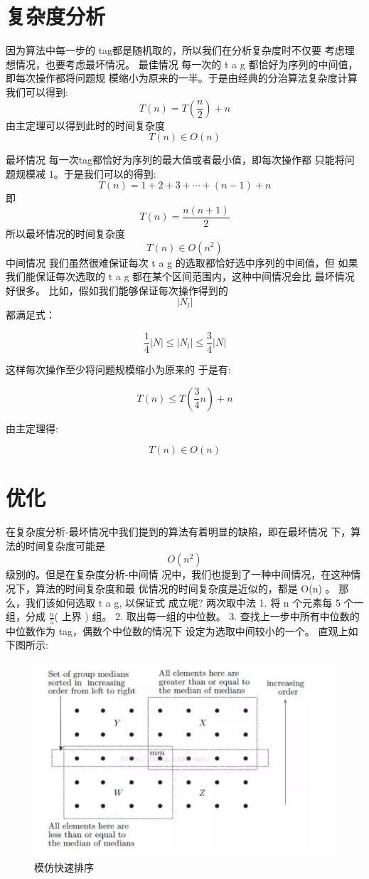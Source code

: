 \section{复杂度分析}
因为算法中每一步的 tag都是随机取的，所以我们在分析复杂度时不仅要 考虑理想情况，也要考虑最坏情况。
最佳情况  \quad  每一次的  t a g  都恰好为序列的中间值，即每次操作都将问题规 模缩小为原来的一半。于是由经典的分治算法复杂度计算我们可以得到:
$$T(n)=T\left(\frac{n}{2}\right)+n$$
由主定理可以得到此时的时间复杂度
$$T(n) \in O(n)$$

最坏情况 每一次tag都恰好为序列的最大值或者最小值，即每次操作都 只能将问题规模减 1。于是我们可以的得到:
$$
T(n)=1+2+3+\cdots+(n-1)+n
$$
即
$$
T(n)=\frac{n(n+1)}{2}
$$
所以最坏情况的时间复杂度
$$
T(n) \in O\left(n^{2}\right)
$$
中间情况  \quad  我们虽然很难保证每次  t a g  的选取都恰好选中序列的中间值，但
如果我们能保证每次选取的  t a g  都在某个区间范围内，这种中间情况会比 最坏情况好很多。
比如，假如我们能够保证每次操作得到的  
$$\left|N_{l}\right|  $$
都满足式：

$$\frac{1}{4}|N| \leq\left|N_{l}\right| \leq \frac{3}{4}|N|$$

这样每次操作至少将问题规模缩小为原来的   \circ  于是有:

$$T(n) \leq T\left(\frac{3}{4} n\right)+n$$

由主定理得:

$$T(n) \in O(n)$$

\section{优化}
在复杂度分析-最坏情况中我们提到的算法有着明显的缺陷，即在最坏情况 下，算法的时间复杂度可能是 
$$O\left(n^{2}\right)$$
级别的。但是在复杂度分析-中间情 况中，我们也提到了一种中间情况，在这种情况下，算法的时间复杂度和最 优情况的时间复杂度是近似的，都是  O(n)  。
那么，我们该如何选取  t a g,  以保证式 成立呢?
两次取中法
1. 将 $ \mathrm{n}$  个元素每 5 个一组，分成  $\frac{n}{5}$(  上界  )  组。
2. 取出每一组的中位数。
3. 查找上一步中所有中位数的中位数作为 tag，偶数个中位数的情况下 设定为选取中间较小的一个。
直观上如下图所示:
\begin{figure}[htb]
	\centering
	\includegraphics[scale=0.5]{image/kth2.png}
  \caption{模仿快速排序}\label{fig:nearestpoints-divide}
\end{figure}

